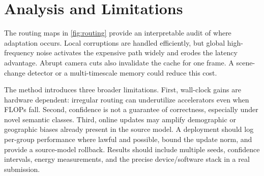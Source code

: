 \section{Analysis and Limitations}
\label{sec:analysis}

The routing maps in \cref{fig:routing} provide an interpretable audit of where
adaptation occurs.  Local corruptions are handled efficiently, but global
high-frequency noise activates the expensive path widely and erodes the
latency advantage.  Abrupt camera cuts also invalidate the cache for one
frame.  A scene-change detector or a multi-timescale memory could reduce this
cost.

The method introduces three broader limitations.  First, wall-clock gains are
hardware dependent: irregular routing can underutilize accelerators even when
FLOPs fall.  Second, confidence is not a guarantee of correctness, especially
under novel semantic classes.  Third, online updates may amplify demographic
or geographic biases already present in the source model.  A deployment should
log per-group performance where lawful and possible, bound the update norm,
and provide a source-model rollback.  Results should include multiple seeds,
confidence intervals, energy measurements, and the precise device/software
stack in a real submission.

